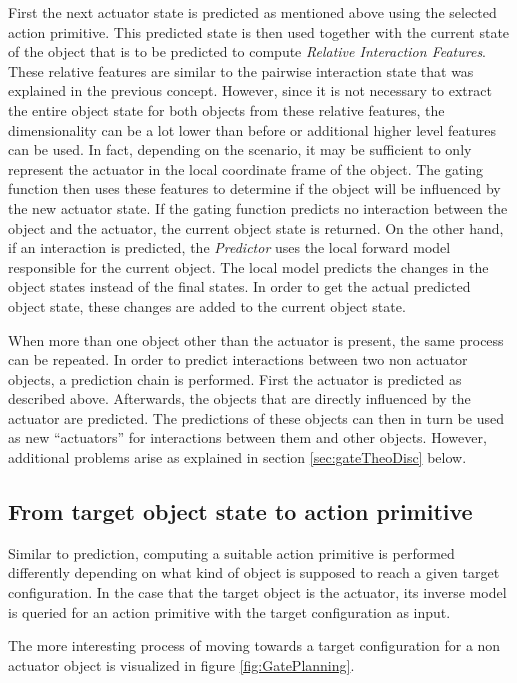 First the next actuator state is predicted as mentioned above using the selected action primitive.
This predicted state is then used together with the current state of the object that is to be predicted to compute \textit{Relative Interaction Features}. These relative features are similar to the pairwise interaction state that was explained in the previous concept. However, since it is not necessary to extract the entire object state for both objects from these relative features, the dimensionality can be a lot lower than before or additional higher level features can be used. In fact, depending on the scenario, it may be sufficient to only represent the actuator in the local coordinate frame of the object. 
The gating function then uses these features to determine if the object will be influenced by the new actuator state. If the gating function predicts no interaction between the object and the actuator, the current object state is returned. 
On the other hand, if an interaction is predicted, the \textit{Predictor} uses the local forward model responsible for the current object. 
The local model predicts the changes in the object states instead of the final states. In order to get the actual predicted object state, these changes are added to the current object state.

When more than one object other than the actuator is present, the same process can be repeated. 
In order to predict interactions between two non actuator objects, a prediction chain is performed. First the actuator is predicted as described above. Afterwards, the objects that are directly influenced by the actuator are predicted. 
The predictions of these objects can then in turn be used as new \enquote{actuators} for interactions between them and other objects. However, additional problems arise as explained in section \ref{sec:gateTheoDisc} below.

\subsection{From target object state to action primitive \label{sec:gatePlanning}}

Similar to prediction, computing a suitable action primitive is performed differently depending on what kind of object is supposed to reach a given target configuration. In the case that the target object is the actuator, its inverse model is queried for an action primitive with the target configuration as input. 

The more interesting process of moving towards a target configuration for a non actuator object is visualized in figure \ref{fig:GatePlanning}.

